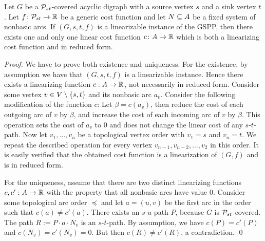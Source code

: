 \begin{lemma}
\label{lemma:nonbasic-arcs}
Let $G$ be a $\mathcal{P}_{st}$-covered acyclic digraph with a source vertex $s$ and a sink vertex $t$. Let  $f\colon  \mathcal{P}_{st} \rightarrow \mathbb{R}$ be a generic cost function and  let $N \subseteq A$ be a fixed system of nonbasic arcs. If  $(G,s,t,f)$ is a linearizable instance of the GSPP, then there exists one and only one linear cost function $c\colon A \rightarrow \mathbb{R}$ which is both a linearizing cost function  and in reduced form.
\end{lemma}
\begin{proof}
    We have to prove both existence and uniqueness. For the existence, by assumption we have that $(G,s,t,f)$ is a linearizable instance. Hence there exists a linearizing function $c : A \rightarrow \mathbb{R}$, not necessarily in reduced form. Consider some vertex $v \in V \setminus \{ s,t \}$ and its nonbasic arc $a_v$. Consider the following modification of the function $c$: Let $\beta = c(a_v)$, then reduce the cost of each outgoing arc of $v$ by $\beta$, and increase the cost of each incoming arc of $v$ by $\beta$. This operation sets the cost of $a_v$ to $0$ and does not change the linear cost of any $s$-$t$-path. Now let $v_1,\dots,v_n$ be a topological vertex order with $v_1 = s$ and $v_n = t$. We repeat the described operation for every vertex $v_{n-1}, v_{n-2}, \dots, v_2$  in this order. It is easily verified that the obtained cost function is a linearization of $(G, f)$ and is in reduced form.
    
    For the uniqueness, assume that there are two distinct linearizing functions $c, c' : A \rightarrow \mathbb{R}$ with the property that all nonbasic arcs have value 0. Consider some topological arc order $\preceq$ and let $a = (u,v)$ be the first arc in the order such that $c(a) \neq c'(a)$. There exists an $s$-$u$-path $P$, because $G$ is $\mathcal{P}_{st}$-covered. The path $R := P \cdot a \cdot N_v$ is an $s$-$t$-path. By assumption, we have $c(P) = c'(P)$ and $c(N_v) = c'(N_v) = 0$. But then $c(R) \neq c'(R)$, a contradiction. 
    \qed
\end{proof}


